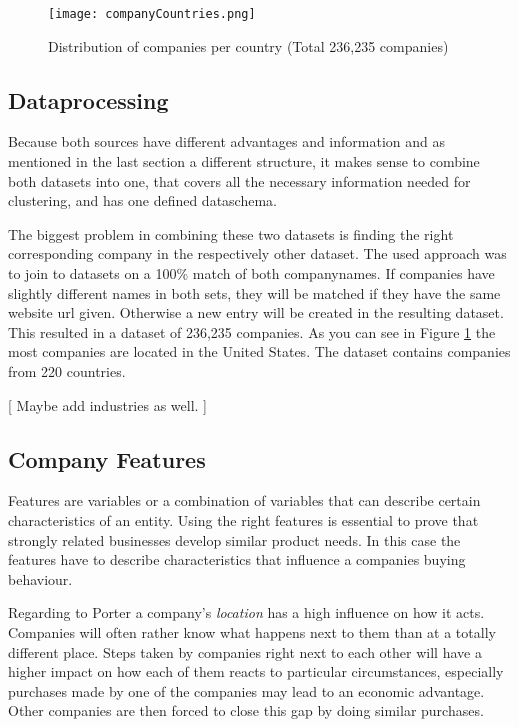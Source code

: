 \begin{figure}[ht]
\texttt{[image: companyCountries.png]}
\centering
\caption{Distribution of companies per country (Total 236,235 companies)}
\label{fig:countryDistribution}
\end{figure}


\subsection{Dataprocessing}
Because both sources have different advantages and information and as mentioned in the last section a different structure,
it makes sense to combine both datasets into one, that covers all the necessary information needed for clustering,
and has one defined dataschema.

The biggest problem in combining these two datasets is finding the right corresponding company in the respectively
other dataset.
The used approach was to join to datasets on a 100\% match of both companynames. If companies have slightly different names
in both sets, they will be matched if they have the same website url given. Otherwise a new entry will be created in
the resulting dataset. This resulted in a dataset of 236,235 companies. As you can see in Figure \ref{fig:countryDistribution}
the most companies are located in the United States. The dataset contains companies from 220 countries.

[ Maybe add industries as well. ]




\subsection{Company Features}
\label{companyFeatures}
Features are variables or a combination of variables that can describe certain characteristics of an entity. Using the right
features is essential to prove that strongly related businesses develop similar product needs. In this case the features have
to describe characteristics that influence a companies buying behaviour.

Regarding to Porter \cite{CompanyClusters} a company's \emph{location} has a high influence on how it acts. Companies will often rather know what happens next to
them than at a totally different place. Steps taken by companies right next to each other will have a higher impact on
how each of them reacts to particular circumstances, especially purchases made by one of the companies may lead to an economic
advantage. Other companies are then forced to close this gap by doing similar purchases.

